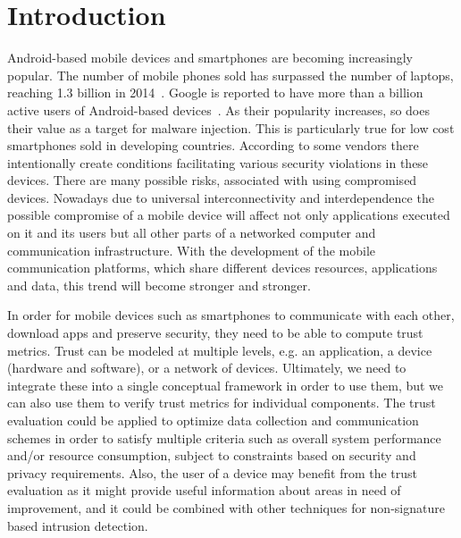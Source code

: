 \section{Introduction}

Android-based mobile devices and smartphones are becoming increasingly popular.  The number of mobile phones
sold has surpassed the number of laptops, reaching 1.3 billion in 
2014~\cite{market}.  Google is 
reported to have more than a billion active users of 
Android-based devices~\cite{android-users}.  
As their popularity increases, so does their value as
a target for malware injection.  
This is particularly true for low cost smartphones sold in developing countries. According to \cite{zheng2014droidray}
some vendors there intentionally create conditions facilitating various security violations in these devices.
 There are many possible risks, associated with using compromised devices.  Nowadays due to universal interconnectivity and 
interdependence the 
possible compromise of a mobile device will affect not only applications executed on it and its users but all other parts 
of a networked computer and communication infrastructure.
With the development of the mobile communication platforms, which share different devices resources, applications and data, 
this trend will become stronger and stronger. 

In order for mobile devices such as smartphones to communicate with each other, download apps and preserve security, they need to
be able to compute trust metrics.   Trust can be modeled at 
multiple levels, e.g. an application, a device (hardware and software), or a network of devices.  Ultimately, we need to 
integrate these into a single conceptual framework in order to use them, but we can also use them to verify trust metrics
for individual components.
The trust evaluation  could 
be applied to optimize data collection and communication schemes in order to satisfy multiple criteria such as overall 
system performance and/or resource consumption, subject to constraints based on security and privacy requirements.
Also, the user of a device may benefit from the trust evaluation as it might 
provide useful information about areas in need of improvement, and it could be combined with other techniques for
 non-signature based intrusion detection.

